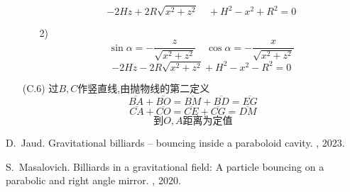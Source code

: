 \documentclass{article}
\begin{document}
\begin{itemize}
\begin{itemize}
        \begin{equation}-2Hz+2R\sqrt{x^2+z^2}\quad+H^2-x^2+R^2=0\end{equation}
        \item[2)]\begin{equation}\sin\alpha=-\dfrac{z}{\sqrt{x^2+z^2}}\quad\cos\alpha=-\dfrac{x}{\sqrt{x^2+z^2}}\end{equation}
        \begin{equation}-2Hz-2R\sqrt{x^2+z^2}+H^2-x^2-R^2=0\end{equation}
    \end{itemize}
    \item[(C.6)]过$B,C$作竖直线,由抛物线的第二定义
    \begin{equation}\overline{BA}+\overline{BO}=\overline{BM}+\overline{BD}=\overline{EG}\end{equation}
    \begin{equation}\overline{CA}+\overline{CO}=\overline{CE}+\overline{CG}=\overline{DM}\end{equation}
    \begin{equation}到O,A距离为定值\end{equation}
\end{itemize}
% 
% 
\begin{thebibliography}{99}  


    D.~Jaud.
    \newblock Gravitational billiards -- bouncing inside a paraboloid cavity.
    , 2023.
    
    S.~Masalovich.
    \newblock Billiards in a gravitational field: A particle bouncing on a
      parabolic and right angle mirror.
    , 2020.
    
    
    \end{thebibliography}
\end{document}

